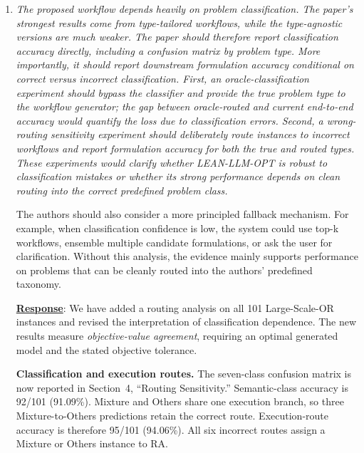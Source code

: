 \documentclass[11pt]{article}
\newcommand{\edit}[1]{{\color{hopkins-blue}\itshape #1}}
\newcommand{\expected}{\noindent\textbf{Expected outputs.} }
\begin{document}
\begin{enumerate}[label=(R1.Major.\arabic*),leftmargin=*]
\expected A documented blind-review protocol and evaluator-agreement statistics; component-level correctness results; the number of structurally incorrect formulations that nevertheless obtain the correct objective value; solution-transfer feasibility and optimality-gap results; and robustness results under controlled parameter perturbations.

\item \edit{The proposed workflow depends heavily on problem classification. The paper's strongest results come from type-tailored workflows, while the type-agnostic versions are much weaker. The paper should therefore report classification accuracy directly, including a confusion matrix by problem type. More importantly, it should report downstream formulation accuracy conditional on correct versus incorrect classification. First, an oracle-classification experiment should bypass the classifier and provide the true problem type to the workflow generator; the gap between oracle-routed and current end-to-end accuracy would quantify the loss due to classification errors. Second, a wrong-routing sensitivity experiment should deliberately route instances to incorrect workflows and report formulation accuracy for both the true and routed types. These experiments would clarify whether LEAN-LLM-OPT is robust to classification mistakes or whether its strong performance depends on clean routing into the correct predefined problem class.

The authors should also consider a more principled fallback mechanism. For example, when classification confidence is low, the system could use top-k workflows, ensemble multiple candidate formulations, or ask the user for clarification. Without this analysis, the evidence mainly supports performance on problems that can be cleanly routed into the authors' predefined taxonomy.}\label{R1-major-3}

\noindent\underline{\textbf{Response}}:
We have added a routing analysis on all 101 Large-Scale-OR instances and revised the interpretation of classification dependence. The new results measure \emph{objective-value agreement}, requiring an optimal generated model and the stated objective tolerance. 

\textbf{Classification and execution routes.}
The seven-class confusion matrix is now reported in Section~4, ``Routing Sensitivity.'' Semantic-class accuracy is 92/101 (91.09\%). Mixture and Others share one execution branch, so three Mixture-to-Others predictions retain the correct route. Execution-route accuracy is therefore 95/101 (94.06\%). All six incorrect routes assign a Mixture or Others instance to RA.


\end{enumerate}
\end{document}
